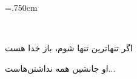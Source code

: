 \baselineskip=.750cm
\thispagestyle{empty}
 


~\vspace{3.5cm}~\\

{\nastaliq
\hspace{1cm}
اگر تنها‌ترین تنها شوم، باز خدا هست
\vspace{.8cm}

\hspace{4.7cm}
او جانشین همه نداشتن‌هاست...
}

